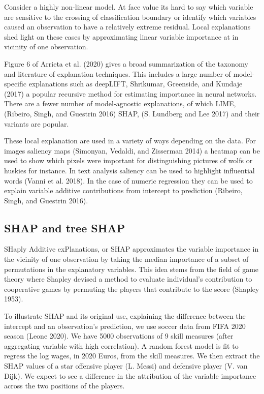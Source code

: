 \documentclass[
]{article}
\begin{document}
Consider a highly non-linear model. At face value its hard to say which variable are sensitive to the crossing of classification boundary or identify which variables caused an observation to have a relatively extreme residual. Local explanations shed light on these cases by approximating linear variable importance at in vicinity of one observation.

Figure 6 of Arrieta et al. (2020) gives a broad summarization of the taxonomy and literature of explanation techniques. This includes a large number of model-specific explanations such as deepLIFT, Shrikumar, Greenside, and Kundaje (2017) a popular recursive method for estimating importance in neural networks. There are a fewer number of model-agnostic explanations, of which LIME, (Ribeiro, Singh, and Guestrin 2016) SHAP, (S. Lundberg and Lee 2017) and their variants are popular.

These local explanation are used in a variety of ways depending on the data. For images saliency maps (Simonyan, Vedaldi, and Zisserman 2014) a heatmap can be used to show which pixels were important for distinguishing pictures of wolfs or huskies for instance. In text analysis saliency can be used to highlight influential words (Vanni et al. 2018). In the case of numeric regression they can be used to explain variable additive contributions from intercept to prediction (Ribeiro, Singh, and Guestrin 2016).

\hypertarget{shap-and-tree-shap}{%
\subsection{SHAP and tree SHAP}\label{shap-and-tree-shap}}

SHaply Additive exPlanations, or SHAP approximates the variable importance in the vicinity of one observation by taking the median importance of a subset of permutations in the explanatory variables. This idea stems from the field of game theory where Shapley devised a method to evaluate individual's contribution to cooperative games by permuting the players that contribute to the score (Shapley 1953).

To illustrate SHAP and its original use, explaining the difference between the intercept and an observation's prediction, we use soccer data from FIFA 2020 season (Leone 2020). We have 5000 observations of 9 skill measures (after aggregating variable with high correlation). A random forest model is fit to regress the log wages, in 2020 Euros, from the skill measures. We then extract the SHAP values of a star offensive player (L. Messi) and defensive player (V. van Dijk). We expect to see a difference in the attribution of the variable importance across the two positions of the players.
\end{document}
